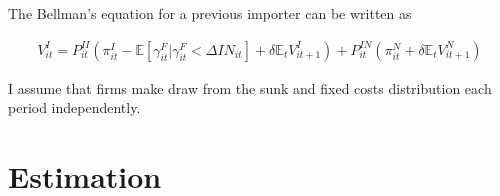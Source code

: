 \documentclass[11pt,letter]{article}
\newcommand{\prn}[1]{\left({#1}\right)}
\newcommand{\lprn}[1]{\left[{#1}\right]}
\begin{document}
\begin{appendices}
\noindent The Bellman's equation for a previous importer can be written as

\begin{align}
V_{it}^I = P_{it}^{II}\prn{\pi_{it}^I  -\mathbb{E}\lprn{\gamma_{it}^F|\gamma_{it}^F < \Delta IN_{it}} + \delta \mathbb{E}_t V_{it+1}^I } +  P_{it}^{IN}\prn{\pi_{it}^N +  \delta \mathbb{E}_t V_{it+1}^N} \label{Bellmanimp}
\end{align}

I assume that firms make draw from the sunk and fixed costs distribution each period independently. 








% 


\section{Estimation}\label{estimation}


\end{appendices}
\end{document}
